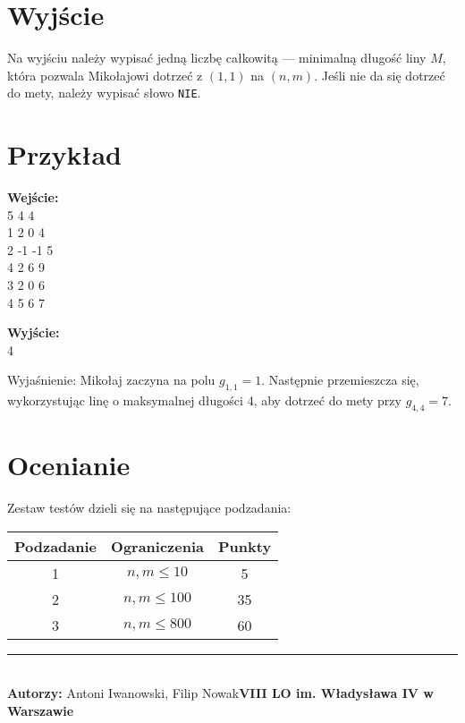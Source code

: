 \documentclass[a4paper,11pt]{article}
\newcommand{\exampleinput}{\\5 4 4
\\1 2 0 4
\\2 -1 -1 5
\\4 2 6 9
\\3 2 0 6
\\4 5 6 7}
\newcommand{\exampleoutput}{\\4}
\newcommand{\explanation}{Mikołaj zaczyna na polu \( g_{1,1} = 1 \). Następnie przemieszcza się, wykorzystując linę o maksymalnej długości 4, aby dotrzeć do mety przy \( g_{4,4} = 7 \).}
\newcommand{\authorinfo}{Antoni Iwanowski, Filip Nowak}
\newcommand{\schoolinfo}{VIII LO im. Władysława IV w Warszawie}
\newcommand{\subtasktable}{%
\begin{tabular}{|c|c|c|}
\hline
Podzadanie & Ograniczenia & Punkty \\
\hline
1 & $n, m \leq 10$ & 5 \\
2 & $n, m \leq 100$ & 35 \\
3 & $n, m \leq 800$ & 60 \\
\hline
\end{tabular}}
\begin{document}
\section*{Wyjście}
Na wyjściu należy wypisać jedną liczbę całkowitą — minimalną długość liny \( M \), która pozwala Mikołajowi dotrzeć z \( (1, 1) \) na \( (n, m) \). Jeśli nie da się dotrzeć do mety, należy wypisać słowo \texttt{NIE}.
\newpage
\section*{Przykład}
\vspace{-0.5cm}
\begin{multicols}{2}
\noindent\textbf{Wejście:}
\exampleinput

\columnbreak

\noindent\textbf{Wyjście:}
\exampleoutput
\end{multicols}

\noindent Wyjaśnienie: \explanation

\section*{Ocenianie}
Zestaw testów dzieli się na następujące podzadania:
\begin{center}
\subtasktable
\end{center}

\vspace*{\fill}
\noindent \rule{\textwidth}{0.4pt} \\
\textbf{Autorzy:} \authorinfo  \hfill \textbf{\schoolinfo} \\
\end{document}
